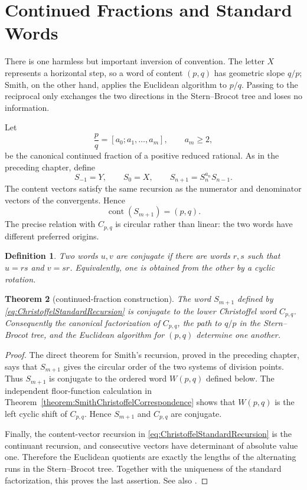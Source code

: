 \documentclass{book}
\newtheorem{definition}{Definition}[section]
\newtheorem{theorem}[definition]{Theorem}
\begin{document}
\section{Continued Fractions and Standard Words}

There is one harmless but important inversion of convention.  The letter
\(X\) represents a horizontal step, so a word of content \((p,q)\) has
geometric slope \(q/p\); Smith, on the other hand, applies the Euclidean
algorithm to \(p/q\).  Passing to the reciprocal only exchanges the two
directions in the Stern--Brocot tree and loses no information.

Let
\[
  \frac pq=[a_0;a_1,\ldots,a_m],
  \qquad a_m\geq2,
\]
be the canonical continued fraction of a positive reduced rational.  As in
the preceding chapter, define
\begin{equation}\label{eq:ChristoffelStandardRecursion}
  S_{-1}=Y,\qquad S_0=X,\qquad
  S_{n+1}=S_n^{a_n}S_{n-1}.
\end{equation}
The content vectors satisfy the same recursion as the numerator and
denominator vectors of the convergents.  Hence
\[
  \operatorname{cont}(S_{m+1})=(p,q).
\]
The precise relation with \(C_{p,q}\) is circular rather than linear: the
two words have different preferred origins.

\begin{definition}
  Two words \(u,v\) are \textnormal{conjugate} if there are words \(r,s\)
  such that \(u=rs\) and \(v=sr\).  Equivalently, one is obtained from the
  other by a cyclic rotation.
\end{definition}

\begin{theorem}[continued-fraction construction]
  \label{theorem:CFChristoffelCorrespondence}
  The word \(S_{m+1}\) defined by
  \eqref{eq:ChristoffelStandardRecursion} is conjugate to the lower
  Christoffel word \(C_{p,q}\).  Consequently the canonical factorization
  of \(C_{p,q}\), the path to \(q/p\) in the Stern--Brocot tree, and the
  Euclidean algorithm for \((p,q)\) determine one another.
\end{theorem}
\begin{proof}
  The direct theorem for Smith's recursion, proved in the preceding
  chapter, says that \(S_{m+1}\) gives the circular order of the two systems
  of division points.  Thus \(S_{m+1}\) is conjugate to the ordered word
  \(W(p,q)\) defined below.  The independent floor-function calculation in
  Theorem~\ref{theorem:SmithChristoffelCorrespondence} shows that
  \(W(p,q)\) is the left cyclic shift of \(C_{p,q}\).  Hence
  \(S_{m+1}\) and \(C_{p,q}\) are conjugate.

  Finally, the content-vector recursion in
  \eqref{eq:ChristoffelStandardRecursion} is the continuant recursion, and
  consecutive vectors have determinant of absolute value one.  Therefore
  the Euclidean quotients are exactly the lengths of the alternating runs
  in the Stern--Brocot tree.  Together with the uniqueness of the standard
  factorization, this proves the last assertion.  See also
  \cite[Chapter~7]{BerstelLauveReutenauerSaliola2009}.
\end{proof}
\end{document}
